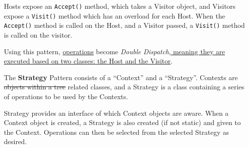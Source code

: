 Hosts expose an \texttt{Accept()} method, which takes a Visitor object, and Visitors expose a \texttt{Visit()} method which has an overload for each Host. When the \texttt{Accept()} method is called on the Host, and a Visitor passed, a \texttt{Visit()} method is called on the visitor.

Using this pattern, \ul{operations} become \textit{Double Dispatch},\ul{ meaning they are executed based on two classes: the Host and the Visitor}.
\nl

The \textbf{Strategy} Pattern consists of a ``Context'' and a ``Strategy''. Contexts are \st{objects within a tree} related classes, and a Strategy is a class containing a series of operations to be used by the Contexts.

Strategy provides an interface of which Context objects are aware. When a Context object is created, a Strategy is also created (if not static) and given to the Context. Operations can then be selected from the selected Strategy as desired.